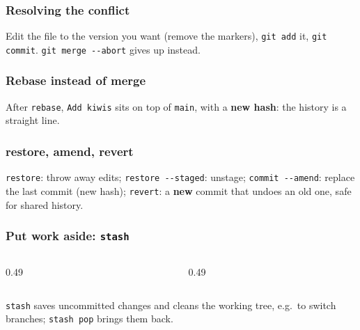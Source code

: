 \documentclass[aspectratio=169,10pt,compress]{beamer}
\begin{document}
\begin{frame}[t,fragile] \frametitle{Resolving the conflict}

  \vspace{0.1em}
  \small
  Edit the file to the version you want (remove the markers), \texttt{git add} it, \texttt{git commit}. \texttt{git merge -{}-abort} gives up instead.
\end{frame}




\begin{frame}[t,fragile] \frametitle{Rebase instead of merge}

  \vspace{0.1em}
  \small
  After \texttt{rebase}, \texttt{Add kiwis} sits on top of \texttt{main}, with a \textbf{new hash}: the history is a straight line.
\end{frame}





\begin{frame}[t,fragile] \frametitle{restore, amend, revert}

  \vspace{0.1em}
  \small
  \texttt{restore}: throw away edits; \texttt{restore -{}-staged}: unstage; \texttt{commit -{}-amend}: replace the last commit (new hash);
  \texttt{revert}: a \textbf{new} commit that undoes an old one, safe for shared history.
\end{frame}




\begin{frame}[t,fragile] \frametitle{Put work aside: \texttt{stash}}
  \begin{columns}[T]
    \begin{column}{0.49\textwidth}
    \end{column}
    \begin{column}{0.49\textwidth}
    \end{column}
  \end{columns}

  \vspace{0.1em}
  \small
  \texttt{stash} saves uncommitted changes and cleans the working tree, e.g.\ to switch branches; \texttt{stash pop} brings them back.
\end{frame}
\end{document}

